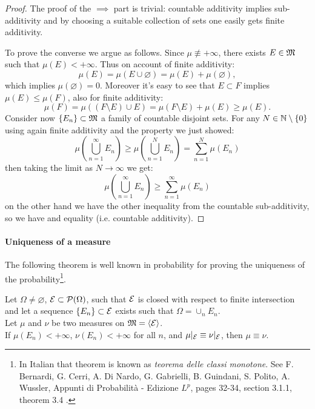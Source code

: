\begin{proof}
	The proof of the $\implies$ part is trivial: countable additivity implies sub-additivity and by choosing a suitable collection of sets one easily gets finite additivity.

	To prove the converse we argue as follows.
	Since $\mu \not\equiv+\infty$, there exists $E\in \mathfrak M$ such that $\mu(E)<+\infty $. Thus on account of finite additivity:
	$$
	\mu(E)=\mu(E\cup \varnothing)=\mu(E)+\mu(\varnothing),
	$$
	which implies $\mu(\varnothing)=0$. Moreover it's easy to see that $E\subset F$ implies $\mu(E)\le \mu(F)$, also for finite additivity:
	$$
	\mu(F)=\mu((F\setminus E)\cup E)=\mu(F\setminus E)+\mu(E)\geq \mu(E).
	$$
	Consider now $\{E_n\}\subset \mathfrak M$ a family of countable disjoint sets. For any $N\in \mathbb N\setminus\{0\}$ using again finite additivity and the property we just showed:
	$$
	\mu\left( \bigcup_{n=1}^{\infty} E_n \right) \geq \mu\left( \bigcup_{n=1}^N E_n \right) = \sum_{n=1}^{N} \mu(E_n) 
	$$
	then taking the limit as $N\to \infty $ we get:
	$$
	\mu\left( \bigcup_{n=1}^{\infty} E_n \right) \geq \sum_{n=1}^{\infty } \mu(E_n) 
	$$
	on the other hand we have the other inequality from the countable sub-additivity, so we have and equality (i.e. countable additivity).
\end{proof}

\paragraph{Uniqueness of a measure} The following theorem is well known in probability for proving the uniqueness of the probability\footnote{In Italian that theorem is known as \textit{teorema delle classi monotone}. See F. Bernardi, G. Cerri, A. Di Nardo, G. Gabrielli, B. Guindani, S. Polito, A. Wussler, Appunti di Probabilità - Edizione $L^p$,	pages 32-34, section 3.1.1, theorem 3.4 .}.
\begin{theo} \label{dynkin} \label{unicity-positive-measure}
  Let $\Omega \neq \varnothing$, $\mathcal E \subset \mathcal P(\Omega)$, such that $\mathcal E$ is closed with respect to finite intersection and let a sequence $\{E_n\} \subset \mathcal E$ exists such that $\Omega = \cup_{n} E_n$.\\
  Let $\mu$ and $\nu$ be two measures on $\mathfrak M = \left\langle\mathcal E\right\rangle$.\\
  If $\mu(E_n) < +\infty$, $\nu(E_n) < +\infty$ for all $n$, and $\mu|_\mathcal E \equiv \nu|_\mathcal E$\footnotemark{}, then $\mu \equiv \nu$.
\end{theo}

